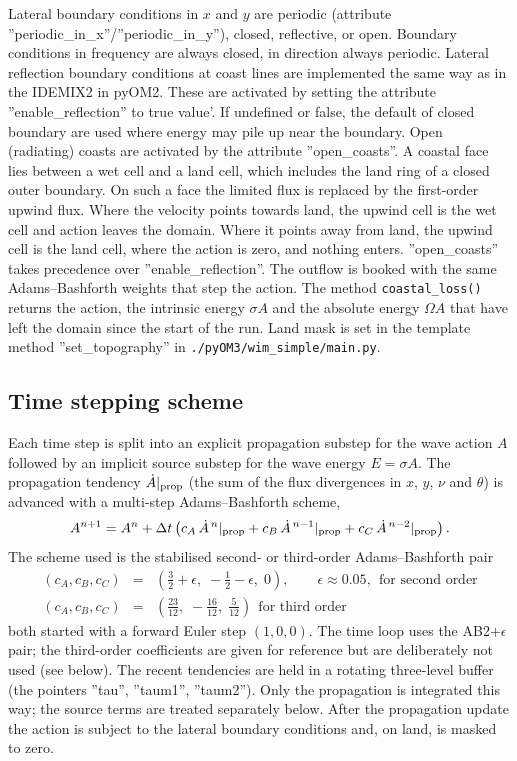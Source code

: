 \documentclass[12pt]{article}
\newcommand{\beq}  { \begin{eqnarray} }
\newcommand{\eeq}  { \end{eqnarray}}
\begin{document}
Lateral boundary conditions in $x$ and $y$ are periodic (attribute ''periodic\_in\_x''/''periodic\_in\_y''),
closed, reflective, or open. Boundary conditions in frequency are always closed, in direction
always periodic.
Lateral 
reflection boundary conditions at coast lines are implemented  the same way as in the 
IDEMIX2 in pyOM2.
These are activated by setting the attribute ''enable\_reflection'' to true value'. 
If undefined or false, the default of closed boundary are used where energy may pile up near the
boundary.
Open (radiating) coasts are activated by the attribute ''open\_coasts''.
A coastal face lies between a wet cell and a land cell, which includes the
land ring of a closed outer boundary.
On such a face the limited flux is replaced by the first-order upwind flux.
Where the velocity points towards land, the upwind cell is the wet cell and
action leaves the domain.
Where it points away from land, the upwind cell is the land cell, where the
action is zero, and nothing enters.
''open\_coasts'' takes precedence over ''enable\_reflection''.
The outflow is booked with the same Adams--Bashforth weights that step the
action.
The method \verb|coastal_loss()| returns the action, the intrinsic energy
$\sigma A$ and the absolute energy $\Omega A$ that have left the domain since
the start of the run.
Land mask is set in the template method   ''set\_topography'' in \verb|./pyOM3/wim_simple/main.py|.


\subsection*{Time stepping scheme}

Each time step is split into an explicit propagation substep for the wave action
$A$ followed by an implicit source substep for the wave energy $E = \sigma A$.
The propagation tendency $\dot A|_{\rm prop}$ (the sum of the flux divergences in
$x$, $y$, $\nu$ and $\theta$) is advanced with a multi-step Adams--Bashforth
scheme,
\beq \label{eq:ab3}
A^{n+1} = A^{n} + \Delta t\left( c_A\, \dot A^{\,n}|_{\rm prop}
                              + c_B\, \dot A^{\,n-1}|_{\rm prop}
                              + c_C\, \dot A^{\,n-2}|_{\rm prop}\right).
\eeq
The scheme used is the stabilised second- or third-order Adams--Bashforth  pair
\beq \label{eq:ab2eps}
(c_A,c_B,c_C) &=& \left(\frac{3}{2}+\epsilon,\; -\frac{1}{2}-\epsilon,\; 0\right),
\qquad \epsilon \approx 0.05, ~~\mbox{for second order}
\\
(c_A,c_B,c_C) &=& \left(\frac{23}{12},\; -\frac{16}{12},\; \frac{5}{12}\right)
~~\mbox{for third order}
\eeq
both started with a forward Euler step $(1,0,0)$. The time loop uses the
AB2$+\epsilon$ pair; the third-order coefficients are given for reference but
are deliberately not used (see below). The recent tendencies are held in a
rotating three-level buffer (the pointers ''tau'', ''taum1'', ''taum2''). Only
the propagation is integrated this way; the source terms are treated separately
below. After the propagation update the action is subject to the lateral
boundary conditions and, on land, is masked to zero.
\end{document}
